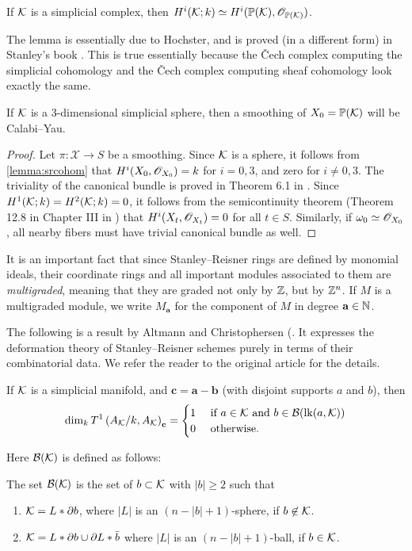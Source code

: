 \begin{lemma}
\label{lemma:srcohom}
If $\mathcal{K}$ is a simplicial complex, then $H^i(\mathcal{K};k) \simeq H^i(\mathbb{P}(\mathcal{K}),\mathscr{O}_{\mathbb{P}(\mathcal{K})})$.
\end{lemma}
The lemma is essentially due to Hochster, and is proved (in a different form) in Stanley's book \cite{stanley_green}. This is true essentially because the \v{C}ech complex computing the simplicial cohomology and the \v{C}ech complex computing sheaf cohomology look exactly the same.

\begin{lemma}
If $\mathcal{K}$ is a 3-dimensional simplicial sphere, then a smoothing of $X_0=\mathbb{P}(\mathcal{K})$ will be Calabi--Yau.
\end{lemma}
\begin{proof}
Let $\pi:\mathscr X \to S$ be a smoothing. Since $\mathcal{K}$ is a sphere, it follows from \cref{lemma:srcohom} that $H^i(X_0,\mathscr{O}_{X_0})=k$ for $i=0,3$, and zero for $i \neq 0,3$. The triviality of the canonical bundle is proved in Theorem 6.1 in \cite{eisenbud_graphcurves}. Since $H^1(\mathcal{K};k)=H^2(\mathcal{K};k)=0$, it follows from the semicontinuity theorem (Theorem 12.8 in Chapter III in \cite{hartshorne}) that $H^i(X_t,\mathscr{O}_{X_t})=0$ for all $t \in S$. Similarly, if $\omega_0 \simeq \mathscr{O}_{X_0}$, all nearby fibers must have trivial canonical bundle as well.
\end{proof}

It is an important fact that since Stanley--Reisner rings are defined by monomial ideals, their coordinate rings and all important modules associated to them are \emph{multigraded}, meaning that they are graded not only by $\mathbb{Z}$, but by $\mathbb{Z}^n$. If $M$ is a multigraded module, we write $M_{\mathbf a}$ for the component of $M$ in degree $\mathbf a \in \mathbb{N}$.

The following is a result by Altmann and Christophersen (\cite[Theorem 4.6]{deforming_christophersen}. It expresses the deformation theory of Stanley--Reisner schemes purely in terms of their combinatorial data. We refer the reader to the original article for the details.

\begin{theorem}
\label{thm:t1dims}
If $\mathcal{K}$ is a simplicial manifold, and $\mathbf c = \mathbf a - \mathbf b$ (with disjoint supports $a$ and $b$), then
$$
\dim_k T^1\left(A_{\mathcal{K}}/k,A_{\mathcal{K}} \right)_{\mathbf c} = \begin{cases}
1 & \text{ if } a  \in \mathcal{K} \text{ and } b \in \mathcal B(\mathrm{lk}(a,\mathcal{K})) \\
0 & \text{ otherwise.}
\end{cases}
$$
\end{theorem}
Here $\mathcal B(\mathcal{K})$ is defined as follows:
\begin{definition}
The set $\mathcal B(\mathcal{K})$ is the set of $b \subset \mathcal{K}$ with $|b| \geq 2$ such that
\begin{enumerate}
	\item $\mathcal{K} = L \ast \partial b$, where $|L|$ is an $(n-|b|+1)$-sphere, if $b \not \in \mathcal{K}$.
	\item $\mathcal{K} = L \ast \partial b \cup \partial L \ast \bar{b}$ where $|L|$ is an $(n-|b|+1)$-ball, if $b \in \mathcal{K}$.
\end{enumerate}
\end{definition}

